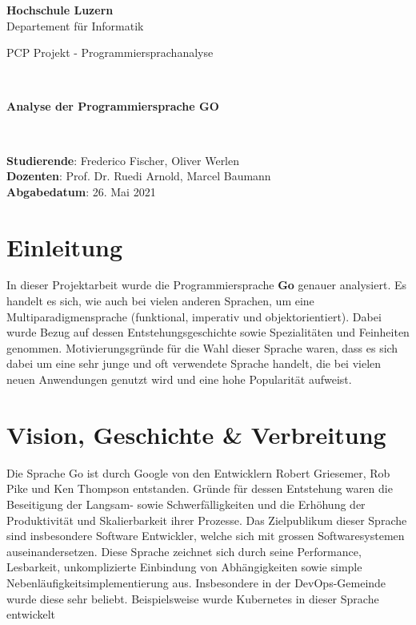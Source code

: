 \documentclass[12pt,titlepage]{article}
\begin{document}
\thispagestyle{empty}

\begin{center}
\textbf{Hochschule Luzern}\\
Departement für Informatik\\[12\baselineskip]

\begin{Huge}
PCP Projekt - Programmiersprachanalyse
\end{Huge} \\[6\baselineskip]

\begin{large}
\textbf{Analyse der Programmiersprache GO}
\end{large} \\[6\baselineskip]

\begin{large}
\textbf{Studierende}: Frederico Fischer, Oliver Werlen\\
\textbf{Dozenten}: Prof. Dr. Ruedi Arnold, Marcel Baumann \\

\textbf{Abgabedatum}: 26. Mai 2021 \\
\end{large}
\end{center}
\newpage


\section{Einleitung}
In dieser Projektarbeit wurde die Programmiersprache \textbf{Go} genauer analysiert.
Es handelt es sich, wie auch bei vielen anderen Sprachen, um eine Multiparadigmensprache (funktional, imperativ und objektorientiert).
Dabei wurde Bezug auf dessen Entstehungsgeschichte sowie Spezialitäten und Feinheiten genommen.
Motivierungsgründe für die Wahl dieser Sprache waren, dass es sich dabei um eine sehr junge und oft verwendete Sprache handelt, die bei vielen neuen Anwendungen genutzt wird und eine hohe Popularität aufweist.

\section{Vision, Geschichte \& Verbreitung}
Die Sprache \glqq Go\grqq{} ist durch Google von den Entwicklern Robert Griesemer, Rob Pike und Ken Thompson entstanden.
Gründe für dessen Entstehung waren die Beseitigung der Langsam- sowie Schwerfälligkeiten und die Erhöhung der Produktivität und Skalierbarkeit ihrer Prozesse.
Das Zielpublikum dieser Sprache sind insbesondere Software Entwickler, welche sich mit grossen Softwaresystemen auseinandersetzen.
Diese Sprache zeichnet sich durch seine Performance, Lesbarkeit, unkomplizierte Einbindung von Abhängigkeiten sowie simple Nebenläufigkeitsimplementierung aus.
Insbesondere in der DevOps-Gemeinde wurde diese sehr beliebt.
Beispielsweise wurde Kubernetes in dieser Sprache entwickelt
\end{document}
